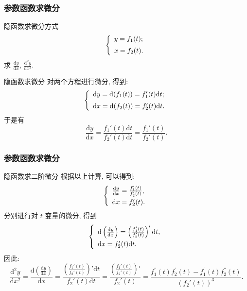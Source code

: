 \documentclass[
10pt,
aspectratio=43,
]{beamer}
\begin{document}
\begin{frame}
	\frametitle{参数函数求微分}
	\everymath{\displaystyle}
	\begin{block}{隐函数求微分方式}
		\begin{equation*}
			\left\{
			\begin{array}{ll}
				y=f_1(t);\vspace{0.2cm} \\
				x=f_2(t).
			\end{array}
			\right.
		\end{equation*}
		求 $\frac{\mathrm{d}y}{\mathrm{d}x}$, $\frac{\mathrm{d}^2y}{\mathrm{d}x^2}$.
	\end{block}
	\pause
	\begin{exampleblock}{隐函数求微分}
		对两个方程进行微分, 得到:
		\begin{equation*}
			\left\{
			\begin{array}{ll}
				\mathrm{d}y=\mathrm{d}(f_1(t))=f_1'(t)\mathrm{d}t;\vspace{0.2cm} \\
				\mathrm{d}x=\mathrm{d}(f_2(t))=f_2'(t)\mathrm{d}t.
			\end{array}
			\right.
		\end{equation*}
		\pause
		于是有
		$$
			\frac{\mathrm{d}y}{\mathrm{d}x}=\frac{f_1'(t)\mathrm{d}t}{f_2'(t)\mathrm{d}t}=\frac{f_1'(t)}{f_2'(t)}.
		$$
	\end{exampleblock}
\end{frame}

\begin{frame}
	\frametitle{参数函数求微分}
	\everymath{\displaystyle}
	\begin{exampleblock}{隐函数求二阶微分}
		根据以上计算, 可以得到:
		\begin{equation*}
			\left\{
			\begin{array}{ll}
				\frac{\mathrm{d}y}{\mathrm{d}x}=\frac{f_1'(t)}{f_2'(t)},\vspace{0.1cm} \\
				\mathrm{d}x=f_2'(t).
			\end{array}
			\right.
		\end{equation*}
		\pause
		分别进行对 $t$ 变量的微分, 得到
		$$
			\left\{
			\begin{array}{ll}
				\mathrm{d}\left(\frac{\mathrm{d}y}{\mathrm{d}x}\right)=\left(\frac{f_1'(t)}{f_2'(t)}\right)'\mathrm{d}t\vspace{0.1cm}, \\
				\mathrm{d}x=f_2'(t)\mathrm{d}t.
			\end{array}
			\right.
		$$
		\pause
		因此:
		$$
			\frac{\mathrm{d}^2y}{\mathrm{d}x^2}=\frac{\mathrm{d}\left(\frac{\mathrm{d}y}{\mathrm{d}x}\right)}{\mathrm{d}x}=\frac{\left(\frac{f_1'(t)}{f_2'(t)}\right)'\mathrm{d}t}{f_2'(t)\mathrm{d}t}=\frac{\left(\frac{f_1'(t)}{f_2'(t)}\right)'}{f_2'(t)}=\frac{f_1^{''}(t)f_2^{'}(t)-f_1^{'}(t)f_2^{''}(t)}{\left(f_2'(t)\right)^3}.
		$$
	\end{exampleblock}
\end{frame}
\end{document}
